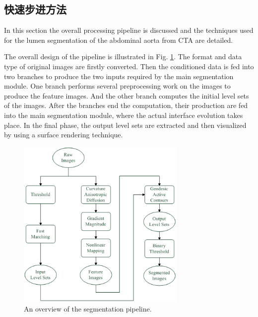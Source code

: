 \subsection{快速步进方法}

In this section the overall processing pipeline is discussed and the techniques used for the lumen segmentation of the abdominal aorta from CTA are detailed.

The overall design of the pipeline is illustrated in Fig. \ref{fig:DataFlow}.
The format and data type of original images are firstly converted.
Then the conditioned data is fed into two branches to produce the two inputs required by the main segmentation module.
One branch performs several preprocessing work on the images to produce the feature images. %
And the other branch computes the initial level sets of the images. %
After the branches end the computation, their production are fed into the main segmentation module, where the actual interface evolution takes place.
In the final phase, the output level sets are extracted and then visualized by using a surface rendering technique.
\begin{figure}[tb]
\centering
\includegraphics[width=3.2in]{Figures/DataFlow.png}
\caption{An overview of the segmentation pipeline.}
\label{fig:DataFlow}
\end{figure}

